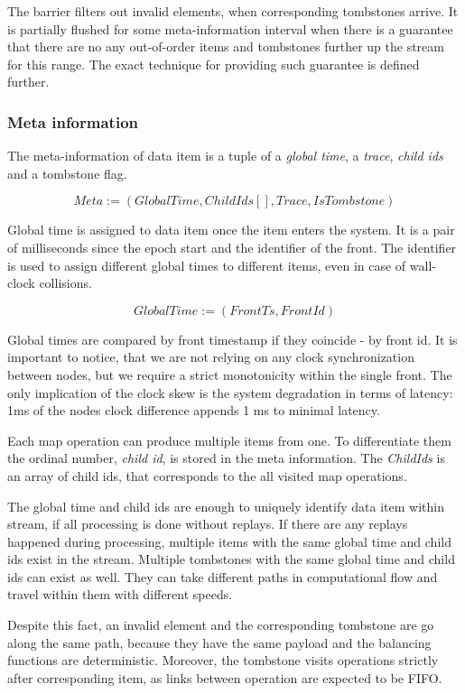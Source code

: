 The barrier filters out invalid elements, when corresponding tombstones arrive. It is partially flushed for some meta-information interval when there is a guarantee that there are no any out-of-order items and tombstones further up the stream for this range. The exact technique for providing such guarantee is defined further.

\subsubsection{Meta information}
The meta-information of data item is a tuple of a {\it global time}, a {\it trace}, {\it child ids} and a tombstone flag.

\[Meta := (GlobalTime, ChildIds[], Trace, IsTombstone)\]

Global time is assigned to data item once the item enters the system. It is a pair of milliseconds since the epoch start and the identifier of the front. The identifier is used to assign different global times to different items, even in case of wall-clock collisions. 

\[GlobalTime := (FrontTs, FrontId)\]

Global times are compared by front timestamp if they coincide - by front id. It is important to notice, that we are not relying on any clock synchronization between nodes, but we require a strict monotonicity within the single front. The only implication of the clock skew is the system degradation in terms of latency: 1ms of the nodes clock difference appends 1 ms to minimal latency.

Each map operation can produce multiple items from one. To differentiate them the ordinal number, {\it child id}, is stored in the meta information. The {\it ChildIds } is an array of child ids, that corresponds to the all visited map operations.

The global time and child ids are enough to uniquely identify data item within stream, if all processing is done without replays. If there are any replays happened during processing, multiple items with the same global time and child ids exist in the stream. Multiple tombstones with the same global time and child ids can exist as well. They can take different paths in computational flow and travel within them with different speeds. 

Despite this fact, an invalid element and the corresponding tombstone are go along the same path, because they have the same payload and the balancing functions are deterministic. Moreover, the tombstone visits operations strictly after corresponding item, as links between operation are expected to be FIFO. 

